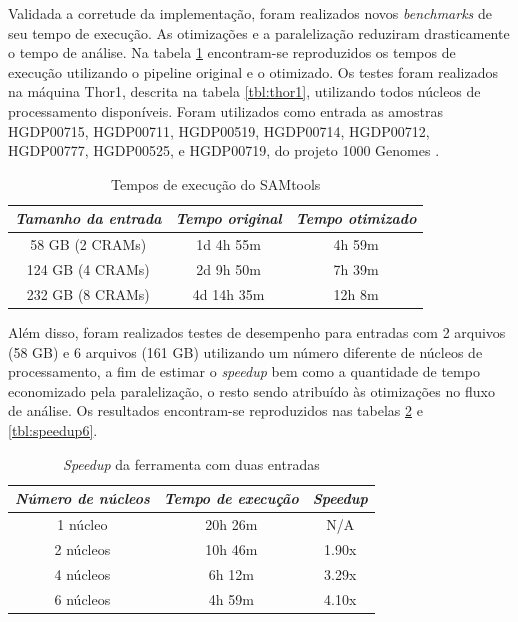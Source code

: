 \documentclass[cic,tc]{iiufrgs}
\begin{document}
{Validada a corretude da implementação, foram realizados novos \textit{benchmarks} de seu
tempo de execução. As otimizações e a paralelização reduziram drasticamente o
tempo de análise. Na tabela \ref{tbl:SAMtools} encontram-se reproduzidos os
tempos de execução utilizando o pipeline original e o otimizado. Os testes
foram realizados na máquina Thor1, descrita na tabela \ref{tbl:thor1},
utilizando todos núcleos de processamento disponíveis. Foram utilizados como
entrada as amostras HGDP00715, HGDP00711, HGDP00519, HGDP00714, HGDP00712,
HGDP00777, HGDP00525, e HGDP00719, do projeto 1000 Genomes \cite{via20101000}.

\begin{table}[h]
    \caption{Tempos de execução do SAMtools}
    \centering
        \begin{tabular}{c|c|c}
          \hline
          \textit{Tamanho da entrada}  &   \textit{Tempo original}  & \textit{Tempo otimizado} \\
          \hline
          \hline
          58 GB (2 CRAMs) & 1d 4h 55m & 4h 59m \\
          124 GB (4 CRAMs) & 2d 9h 50m & 7h 39m \\
          232 GB (8 CRAMs) & 4d 14h 35m & 12h 8m \\
          \hline
        \end{tabular}
    \label{tbl:SAMtools}
\end{table}

Além disso, foram realizados testes de desempenho para entradas com 2 arquivos
(58 GB) e 6 arquivos (161 GB) utilizando um número diferente de núcleos de
processamento, a fim de estimar o \textit{speedup} bem como a quantidade de
tempo economizado pela paralelização, o resto sendo atribuído às otimizações no
fluxo de análise. Os resultados encontram-se reproduzidos nas tabelas
\ref{tbl:speedup2} e \ref{tbl:speedup6}.

\begin{table}[h]
    \caption{\textit{Speedup} da ferramenta com duas entradas}
    \centering
        \begin{tabular}{c|c|c}
          \hline
          \textit{Número de núcleos}  &   \textit{Tempo de execução}  & \textit{Speedup} \\
          \hline
          \hline
          1 núcleo & 20h 26m & N/A \\
          2 núcleos & 10h 46m & 1.90x \\
          4 núcleos & 6h 12m & 3.29x \\
          6 núcleos & 4h 59m & 4.10x \\
          \hline
        \end{tabular}
    \label{tbl:speedup2}
\end{table}

}
\end{document}
